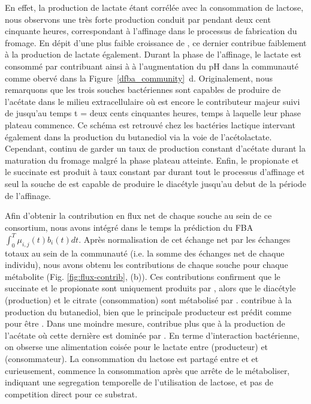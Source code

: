 \documentclass[../main.tex]{subfiles}
\begin{document}
En effet, la production de lactate étant corrélée avec la consommation de lactose, nous observons une très forte production conduit par \lactis pendant deux cent cinquante heures, correspondant à l'affinage dans le processus de fabrication du fromage. En dépit d'une plus faible croissance de \plantarum, ce dernier contribue faiblement à la production de lactate également. Durant la phase de l'affinage, le lactate est consommé par \freud contribuant ainsi à à l'augmentation du pH dans la communauté comme obervé dans la Figure~\ref{dfba_community}~d. Originalement, nous remarquons que les trois souches bactériennes sont capables de produire de l'acétate dans le milieu extracellulaire où \lactis est encore le contributeur majeur suivi de \plantarum jusqu'au temps t = deux cents cinquantes heures, temps à laquelle leur phase plateau commence. Ce schéma est retrouvé chez les bactéries lactique intervant également dans la production du butanediol via la voie de l'acétolactate. Cependant, \freud continu de garder un taux de production constant d'acétate durant la maturation du fromage malgré la phase plateau atteinte. Enfin, le propionate et le succinate est produit à taux constant par \freud durant tout le processus d'affinage et seul la souche de \lactis est capable de produire le diacétyle jusqu'au debut de la période de l'affinage.


Afin d'obtenir la contribution en flux net de chaque souche au sein de ce consortium, nous avons intégré dans le temps la prédiction du FBA $\int_0^T \mu_{i,j}(t) b_i(t) dt$. Après normalisation de cet échange net par les échanges totaux au sein de la communauté (i.e. la somme des échanges net de chaque individu), nous avons obtenu les contributions de chaque souche pour chaque métabolite (Fig. \ref{fig:flux-contrib}, (b)). Ces contributions confirment que le succinate et le propionate sont uniquement produits par \freud, alors que le diacétyle (production) et le citrate (consommation) sont métabolisé par \lactis. \plantarum contribue à la production du butanediol, bien que le principale producteur est prédit comme pour être \lactis. Dans une moindre mesure, \lactis contribue plus que \plantarum à la production de l'acétate où cette dernière est dominée par \freud. En terme d'interaction bactérienne, on obserse une alimentation coisée pour le lactate entre \lactis (producteur) et \freud (consommateur). La consommation du lactose est partagé entre \lactis et \freud et curieusement, \freud commence la consommation après que \lactis arrête de le métaboliser, indiquant une segregation temporelle de l'utilisation de lactose, et pas de competition direct pour ce substrat.
\end{document}

